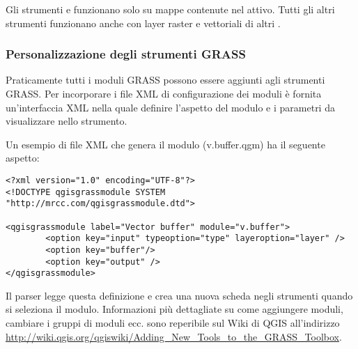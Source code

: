 Gli strumenti  e
 funzionano solo su
mappe contenute nel  attivo. Tutti gli altri strumenti
funzionano anche con layer raster e vettoriali di altri .

\subsubsection{Personalizzazione degli strumenti GRASS} 
\label{sec:toolbox-customizing}

Praticamente tutti i moduli GRASS possono essere aggiunti agli strumenti
GRASS. Per incorporare i file XML di configurazione dei moduli è fornita
un'interfaccia XML nella quale definire l'aspetto del modulo e i parametri
da visualizzare nello strumento.

Un esempio di file XML che genera il modulo  (v.buffer.qgm)
ha il seguente aspetto:

\begin{verbatim}
<?xml version="1.0" encoding="UTF-8"?>
<!DOCTYPE qgisgrassmodule SYSTEM "http://mrcc.com/qgisgrassmodule.dtd">

<qgisgrassmodule label="Vector buffer" module="v.buffer">
        <option key="input" typeoption="type" layeroption="layer" />
        <option key="buffer"/>
        <option key="output" />
</qgisgrassmodule>
\end{verbatim}

Il parser legge questa definizione e crea una nuova scheda negli strumenti
quando si seleziona il modulo. Informazioni più dettagliate su come aggiungere
moduli, cambiare i gruppi di moduli ecc. sono reperibile sul Wiki di QGIS
all'indirizzo \\
\url{http://wiki.qgis.org/qgiswiki/Adding\_New\_Tools\_to\_the\_GRASS\_Toolbox}.

